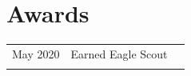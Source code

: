 \documentclass[]{latex/resume}
\begin{document}
\begin{minipage}[t]{0.75\textwidth}
    \sectionsep




\section{Awards} 
    \begin{tabular}{rll}
        May 2020 & Earned Eagle Scout \\
        \\
    \end{tabular}
    \sectionsep
%
%

\end{minipage} 
\hfill
\end{document}
